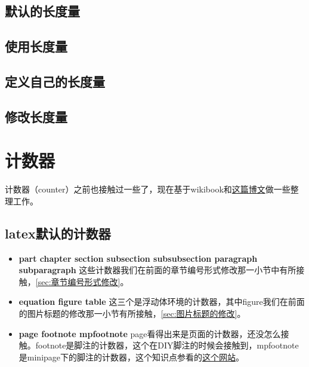 \documentclass[11pt,oneside]{book}
\begin{document}
\begin{common-format}
\subsection{默认的长度量}
\subsection{使用长度量}
\subsection{定义自己的长度量}
\subsection{修改长度量}



\section{计数器}
计数器（counter）之前也接触过一些了，现在基于wikibook和\href{http://texblog.org/2007/07/25/counters-in-latex/}{这篇博文}做一些整理工作。


\subsection{latex默认的计数器}
\begin{itemize}
\item \textbf{part chapter section subsection subsubsection paragraph subparagraph} 这些计数器我们在前面的章节编号形式修改那一小节中有所接触，\ref{sec:章节编号形式修改}。
\item \textbf{equation figure table} 这三个是浮动体环境的计数器，其中figure我们在前面的图片标题的修改那一小节有所接触，\ref{sec:图片标题的修改}。
\item \textbf{page footnote mpfootnote} page看得出来是页面的计数器，还没怎么接触。footnote是脚注的计数器，这个在DIY脚注的时候会接触到，mpfootnote是minipage下的脚注的计数器，这个知识点参看的\href{http://tex.stackexchange.com/questions/18499/how-to-change-symbol-for-footnote-in-minipage}{这个网站}。
\end{itemize}


\end{common-format}
\end{document}
